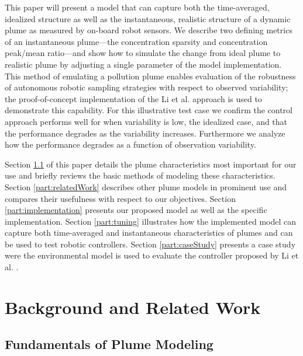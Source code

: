 \documentclass[ letterpaper, 10 pt, conference]{ieeeconf}  %
\begin{document}
This paper will present a model that can capture both the time-averaged, idealized structure as well as the instantaneous, realistic structure of a dynamic plume as measured by on-board robot sensors.  We describe two defining metrics of an instantaneous plume---the concentration sparsity and concentration peak/mean ratio---and show how to simulate the change from ideal plume to realistic plume by adjusting a single parameter of the model implementation. This method of emulating a pollution plume enables evaluation of the robustness of autonomous robotic sampling strategies with respect to observed variability; the proof-of-concept implementation of the Li et al. approach \cite{Li2014} is used to demonstrate this capability.  For this illustrative test case we confirm the control approach performs well for when variability is low, the idealized case, and that the performance degrades as the variability increases.  Furthermore we analyze how the performance degrades as a function of observation variability.

Section \ref{part:background} of this paper details the plume characteristics most important for our use and briefly reviews the basic methods of modeling these characteristics. 
Section \ref{part:relatedWork} describes other plume models in prominent use and compares their usefulness with respect to our objectives.
Section \ref{part:implementation} presents our proposed model as well as the specific implementation.  Section \ref{part:tuning} illustrates how the implemented model can capture both time-averaged and instantaneous characteristics of plumes and can be used to test robotic controllers.  
Section \ref{part:caseStudy} presents a case study were the environmental model is used to evaluate the controller proposed by Li et al. \cite{Li2014}.




\section{Background and Related Work}
\subsection{Fundamentals of Plume Modeling} \label{part:background}
\end{document}

